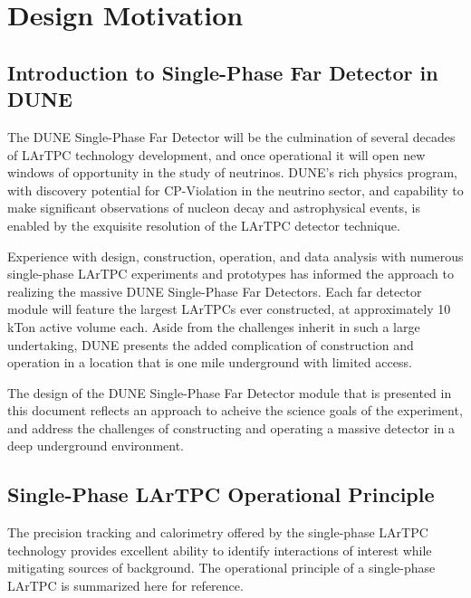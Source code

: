 \chapter{Design Motivation}
\label{ch:fdsp-apa-design}

\section{Introduction to Single-Phase Far Detector in DUNE}
\label{sec:fdsp-design-intro}

The DUNE Single-Phase Far Detector will be the culmination of several decades
of LArTPC technology development, and once operational it will open new windows of opportunity in the study
of neutrinos.  DUNE's rich physics program, with discovery
potential for CP-Violation in the neutrino sector, and capability to make
significant observations of nucleon decay and astrophysical events, is enabled
by the exquisite resolution of the LArTPC detector technique.

Experience with design, construction, operation, and data
analysis with numerous single-phase LArTPC experiments and prototypes has informed the approach to
realizing the massive DUNE Single-Phase Far Detectors. Each far detector module will feature the largest LArTPCs ever
constructed, at approximately 10 kTon active volume each.  Aside from the
challenges inherit in such a large undertaking, DUNE presents the added complication of construction and operation in a location
that is one mile underground with limited access.

The design of the DUNE Single-Phase Far Detector module that is presented in this document
reflects an approach to acheive the science goals of the experiment, and
address the challenges of constructing and operating a massive detector in a deep
underground environment.


\section{Single-Phase LArTPC Operational Principle}
\label{sec:fdsp-design-op}

The precision tracking and calorimetry offered by the single-phase LArTPC
technology provides excellent ability to identify interactions of interest
while mitigating sources of background.  The operational principle of a
single-phase LArTPC is summarized here for reference.

